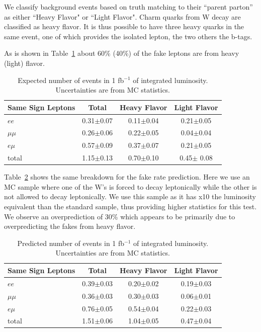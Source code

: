We classify \ttbar background events based on truth matching to their ``parent parton''
as either ``Heavy Flavor" or ``Light Flavor". Charm quarks from W decay are classified as heavy flavor.
It is thus possible to have three heavy quarks in the same event, one of which provides the isolated lepton,
the two others the b-tags.

As is shown in Table~\ref{tab:fakeOrigin1}  about 60\% (40\%) of the fake leptons are from heavy (light) flavor.


\begin{table}[hbt]
\begin{center}
\begin{tabular}{|l|c|c|c|}\hline
Same Sign Leptons & Total  & Heavy Flavor & Light Flavor  \\ \hline

$ee$ & 0.31$\pm$0.07 &  0.11$\pm$0.04 & 0.21$\pm$0.05  \\
$\mu\mu$ & 0.26$\pm$0.06 & 0.22$\pm$0.05 & 0.04$\pm$0.04 \\
$e\mu$ & 0.57$\pm$0.09 & 0.37$\pm$0.07 & 0.21$\pm$0.05 \\
total & 1.15$\pm$0.13 & 0.70$\pm$0.10 & 0.45$\pm$ 0.08 \\ \hline
\end{tabular}
\caption{ Expected number of \ttbar events in 1 fb$^{-1}$ of integrated luminosity. Uncertainties are from MC statistics.\label{tab:fakeOrigin1}}
\end{center}
\end{table}

Table~\ref{tab:fakeOrigin2} shows the same breakdown for the fake rate prediction.
Here we use an MC sample where one of the W's is forced to decay leptonically while the other is not allowed to decay
leptonically.
We use this sample as it has x10 the luminosity equivalent than the standard \ttbar sample, thus providing higher statistics for 
this test. We observe an overprediction of 30\% which appears to be primarily due to overpredicting the fakes from heavy flavor.

\begin{table}[hbt]
\begin{center}
\begin{tabular}{|l|c|c|c|}\hline
Same Sign Leptons & Total &  Heavy Flavor & Light Flavor\\ \hline
$ee$ & 0.39$\pm$0.03 & 0.20$\pm$0.02 & 0.19$\pm$0.03 \\
$\mu\mu$ & 0.36$\pm$0.03 & 0.30$\pm$0.03 & 0.06$\pm$0.01 \\
$e\mu$ & 0.76$\pm$0.05 & 0.54$\pm$0.04 & 0.22$\pm$0.03 \\
total & 1.51$\pm$0.06 & 1.04$\pm$0.05 & 0.47$\pm$0.04  \\ \hline
\end{tabular}
\caption{ Predicted number of \ttbar events in 1 fb$^{-1}$ of integrated luminosity. Uncertainties are from MC statistics.\label{tab:fakeOrigin2}}
\end{center}
\end{table}

